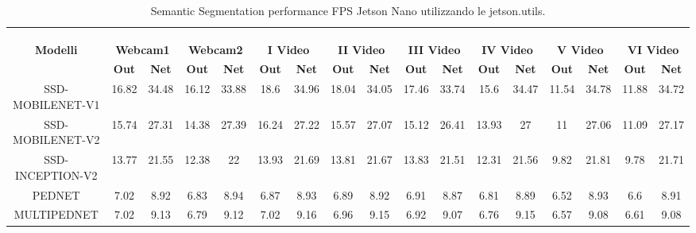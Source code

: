 \begin{landscape}
    \begin{table}
        \centering
        {\scriptsize %
        \begin{tabular}{|c||c|c||c|c||c|c||c|c||c|c||c|c||c|c||c|c||}
            \hline
            & \multicolumn{16}{c||}{ \multirow{3}{*}{\bfseries{\large SEMANTIC SEGMENTATION (SEGNET) - JETSON NANO (utils)}}}\\
            & \multicolumn{16}{c||}{}\\
            & \multicolumn{16}{c||}{}\\
            \hline
            \multirow{2}{*}{\bfseries{\large Modelli}} 
            & \multicolumn{2}{c||}{\bfseries{\normalsize Webcam1}} & \multicolumn{2}{c||}{\bfseries{\normalsize Webcam2}} & \multicolumn{2}{c||}{\bfseries{\normalsize \RN{1} Video}} & \multicolumn{2}{c||}{\bfseries{\normalsize \RN{2} Video}} & \multicolumn{2}{c||}{\bfseries{\normalsize \RN{3} Video}} & \multicolumn{2}{c||}{\bfseries{\normalsize \RN{4} Video}} & \multicolumn{2}{c||}{\bfseries{\normalsize \RN{5} Video}} & \multicolumn{2}{c||}{\bfseries{\normalsize \RN{6} Video}}\\            & \bfseries{\footnotesize Out} & \bfseries{\footnotesize Net} & \bfseries{\footnotesize Out} & \bfseries{\footnotesize Net} & \bfseries{\footnotesize Out} & \bfseries{\footnotesize Net} & \bfseries{\footnotesize Out} & \bfseries{\footnotesize Net} & \bfseries{\footnotesize Out} & \bfseries{\footnotesize Net} & \bfseries{\footnotesize Out} & \bfseries{\footnotesize Net} & \bfseries{\footnotesize Out} & \bfseries{\footnotesize Net} & \bfseries{\footnotesize Out} & \bfseries{\footnotesize Net}\\
            \hline
            SSD-MOBILENET-V1& 16.82 & 34.48 & 16.12 & 33.88 & 18.6 & 34.96 & 18.04 & 34.05 & 17.46 & 33.74 & 15.6 & 34.47 & 11.54 & 34.78 & 11.88 & 34.72\\
            \hline
            SSD-MOBILENET-V2& 15.74 & 27.31 & 14.38 & 27.39 & 16.24 & 27.22 & 15.57 & 27.07 & 15.12 & 26.41 & 13.93 & 27 & 11 & 27.06 & 11.09 & 27.17\\
            \hline 
            SSD-INCEPTION-V2& 13.77 & 21.55 & 12.38 & 22 & 13.93 & 21.69 & 13.81 & 21.67 & 13.83 & 21.51 & 12.31 & 21.56 & 9.82 & 21.81 & 9.78 & 21.71\\
            \hline
            PEDNET& 7.02 & 8.92 & 6.83 & 8.94 & 6.87 & 8.93 & 6.89 & 8.92 & 6.91 & 8.87 & 6.81 & 8.89 & 6.52 & 8.93 & 6.6 & 8.91\\
            \hline
            MULTIPEDNET& 7.02 & 9.13 & 6.79 & 9.12 & 7.02 & 9.16 & 6.96 & 9.15 & 6.92 & 9.07 & 6.76 & 9.15 & 6.57 & 9.08 & 6.61 & 9.08\\
            \hline
        \end{tabular}
        }%
        \vspace{0.5cm}
        \caption{Semantic Segmentation performance FPS Jetson Nano utilizzando le jetson.utils.}
        \label{sem_seg_jetson_utils}
    \end{table}
\end{landscape}


